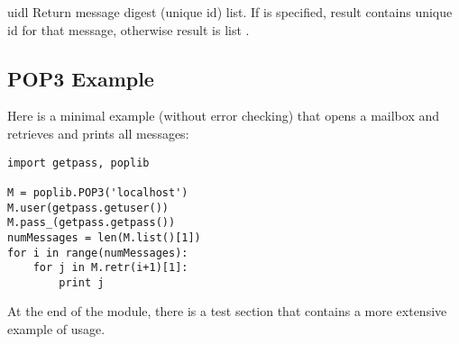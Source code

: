 \begin{methoddesc}{uidl}{}
Return message digest (unique id) list.
If  is specified, result contains unique id for that
message, otherwise result is list .
\end{methoddesc}


\subsection{POP3 Example}
\label{pop3-example}

Here is a minimal example (without error checking) that opens a
mailbox and retrieves and prints all messages:

\begin{verbatim}
import getpass, poplib

M = poplib.POP3('localhost')
M.user(getpass.getuser())
M.pass_(getpass.getpass())
numMessages = len(M.list()[1])
for i in range(numMessages):
    for j in M.retr(i+1)[1]:
        print j
\end{verbatim}

At the end of the module, there is a test section that contains a more
extensive example of usage.
